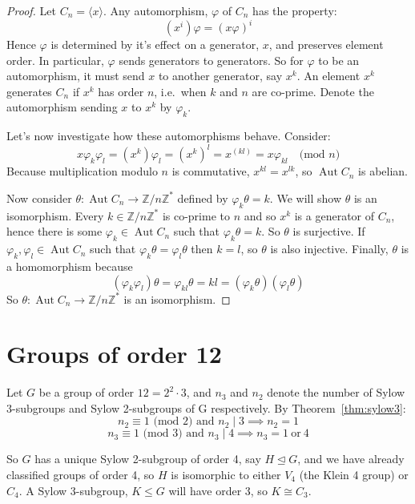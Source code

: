 \documentclass[a4paper, oneside, 12pt, final]{article}
\theoremstyle{definition}
\DeclareMathOperator{\Aut}{Aut}
\newcommand{\Z}{\mathbb{Z}}
\newcommand{\Zn}[1]{\Z/#1\Z}
\begin{document}
\begin{proof}
    Let \(C_n = \langle x \rangle\).
    Any automorphism, \(\varphi\) of \(C_n\) has the property:
    \[(x^i)\varphi = {(x\varphi)}^i\]
    Hence \(\varphi\) is determined by it's effect on a generator, \(x\), and preserves element
    order.
    In particular, \(\varphi\) sends generators to generators.
    So for \(\varphi\) to be an automorphism, it must send \(x\) to another generator, say \(x^k\).
    An element \(x^k\) generates \(C_n\) if \(x^k\) has order \(n\), i.e.\ when \(k\) and \(n\) are co-prime.
    Denote the automorphism sending \(x\) to \(x^k\) by \(\varphi_k\).

    Let's now investigate how these automorphisms behave.
    Consider:
    \[x\varphi_k\varphi_l = (x^k)\varphi_l = {(x^k)}^l = x^{(kl)} = x\varphi_{kl} \quad \text{(mod \(n\))}\]
    Because multiplication modulo \(n\) is commutative, \(x^{kl} = x^{lk}\), so \(\Aut{C_n}\) is abelian.

    Now consider \(\theta:\Aut{C_n} \to \Zn{n}^*\) defined by \(\varphi_k\theta = k\).
    We will show \(\theta\) is an isomorphism.
    Every \(k \in \Zn{n}^*\) is co-prime to \(n\) and so \(x^k\) is a generator of \(C_n\), hence there is some \(\varphi_k
    \in \Aut{C_n}\) such that \(\varphi_k\theta = k\).
    So \(\theta\) is surjective.
    If \(\varphi_k, \varphi_l \in \Aut{C_n}\) such that \(\varphi_k\theta = \varphi_l\theta\) then \(k = l\), so
    \(\theta\) is also injective.
    Finally, \(\theta\) is a homomorphism because
    \[(\varphi_k\varphi_l)\theta = \varphi_{kl}\theta = kl = (\varphi_k\theta)(\varphi_l\theta)\]
    So \(\theta:\Aut{C_n} \to \Zn{n}^*\) is an isomorphism.
\end{proof}



\section{Groups of order 12}
Let \(G\) be a group of order \(12 = 2^2 \cdot 3\), and \(n_3\) and \(n_2\) denote the number of Sylow 3-subgroups and
Sylow 2-subgroups of G respectively.
By Theorem~\ref{thm:sylow3}:
\[n_2 \equiv 1 \text{ (mod 2) and } n_2 \mid 3 \implies n_2 = 1\]
\[n_3 \equiv 1 \text{ (mod 3) and } n_3 \mid 4 \implies n_3 = 1 \ \text{or} \ 4\]

So \(G\) has a unique Sylow 2-subgroup of order 4, say \(H \unlhd G\), and we have already classified groups of order 4,
so \(H\) is isomorphic to either \(V_4\) (the Klein 4 group) or \(C_4\).
A Sylow 3-subgroup, \(K \leqslant G\) will have order 3, so \(K \cong C_3\).
\end{document}
